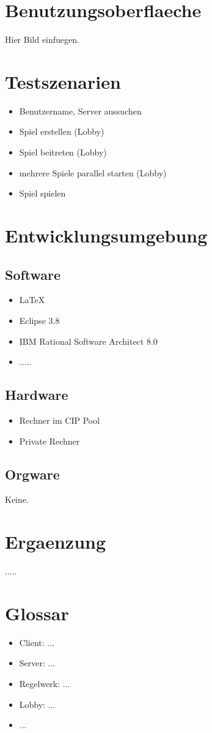 \documentclass{article}
\begin{document}
\section{Benutzungsoberflaeche}
Hier Bild einfuegen.

\section{Testszenarien}
\begin{itemize}
	\item Benutzername, Server aussuchen
	\item Spiel erstellen (Lobby)
	\item Spiel beitreten (Lobby)
	\item mehrere Spiele parallel starten (Lobby)
	\item Spiel spielen 
\end{itemize}

\section{Entwicklungsumgebung}
\subsection{Software}
\begin{itemize}
	\item LaTeX
	\item Eclipse 3.8
	\item IBM Rational Software Architect 8.0
	\item .....
\end{itemize}

\subsection{Hardware}
\begin{itemize}
	\item Rechner im CIP Pool	
	\item Private Rechner
\end{itemize}

\subsection{Orgware}
Keine.

\section{Ergaenzung}
.....
\section{Glossar}
\begin{itemize}
	\item Client: ...
	\item Server: ...
	\item Regelwerk: ...
	\item Lobby: ...
	\item ...
\end{itemize}
\end{document}
